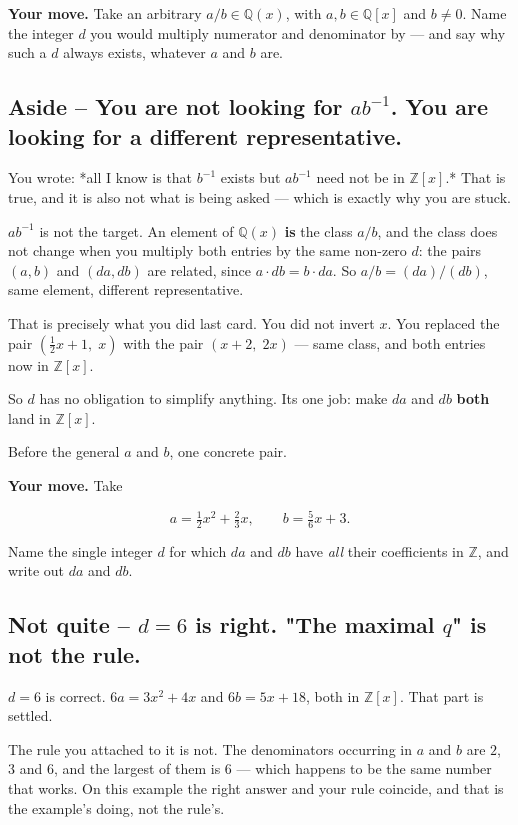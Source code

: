 \documentclass[11pt]{article}
\begin{document}
\textbf{Your move.} Take an arbitrary $a/b \in \mathbb{Q}(x)$, with $a, b \in \mathbb{Q}[x]$ and $b \neq 0$. Name the integer $d$ you would multiply numerator and denominator by --- and say why such a $d$ always exists, whatever $a$ and $b$ are.


\subsection*{Aside -- You are not looking for $ab^{-1}$. You are looking for a different representative.}
You wrote: *all I know is that $b^{-1}$ exists but $ab^{-1}$ need not be in $\mathbb{Z}[x]$.* That is true, and it is also not what is being asked --- which is exactly why you are stuck.

$ab^{-1}$ is not the target. An element of $\mathbb{Q}(x)$ \textbf{is} the class $a/b$, and the class does not change when you multiply both entries by the same non-zero $d$: the pairs $(a,b)$ and $(da, db)$ are related, since $a \cdot db = b \cdot da$. So $a/b = (da)/(db)$, same element, different representative.

That is precisely what you did last card. You did not invert $x$. You replaced the pair $(\tfrac12 x + 1,\; x)$ with the pair $(x+2,\; 2x)$ --- same class, and both entries now in $\mathbb{Z}[x]$.

So $d$ has no obligation to simplify anything. Its one job: make $da$ and $db$ \textbf{both} land in $\mathbb{Z}[x]$.

Before the general $a$ and $b$, one concrete pair.

\textbf{Your move.} Take

$$a = \tfrac{1}{2}x^{2} + \tfrac{2}{3}x, \qquad b = \tfrac{5}{6}x + 3 .$$

Name the single integer $d$ for which $da$ and $db$ have \emph{all} their coefficients in $\mathbb{Z}$, and write out $da$ and $db$.


\subsection*{Not quite -- $d = 6$ is right. "The maximal $q$" is not the rule.}
$d = 6$ is correct. $6a = 3x^{2} + 4x$ and $6b = 5x + 18$, both in $\mathbb{Z}[x]$. That part is settled.

The rule you attached to it is not. The denominators occurring in $a$ and $b$ are $2$, $3$ and $6$, and the largest of them is $6$ --- which happens to be the same number that works. On this example the right answer and your rule coincide, and that is the example's doing, not the rule's.
\end{document}

